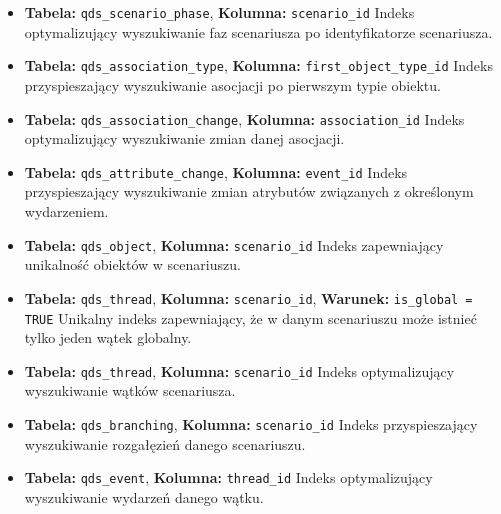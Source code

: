 \begin{itemize}
    \item \textbf{Tabela:} \texttt{qds\_scenario\_phase}, \textbf{Kolumna:} \texttt{scenario\_id}
    Indeks optymalizujący wyszukiwanie faz scenariusza po identyfikatorze scenariusza.

    \item \textbf{Tabela:} \texttt{qds\_association\_type}, \textbf{Kolumna:} \texttt{first\_object\_type\_id}
    Indeks przyspieszający wyszukiwanie asocjacji po pierwszym typie obiektu.

    \item \textbf{Tabela:} \texttt{qds\_association\_change}, \textbf{Kolumna:} \texttt{association\_id}
    Indeks optymalizujący wyszukiwanie zmian danej asocjacji.

    \item \textbf{Tabela:} \texttt{qds\_attribute\_change}, \textbf{Kolumna:} \texttt{event\_id}
    Indeks przyspieszający wyszukiwanie zmian atrybutów związanych z określonym wydarzeniem.

    \item \textbf{Tabela:} \texttt{qds\_object}, \textbf{Kolumna:} \texttt{scenario\_id}
    Indeks zapewniający unikalność obiektów w scenariuszu.

    \item \textbf{Tabela:} \texttt{qds\_thread}, \textbf{Kolumna:} \texttt{scenario\_id}, \textbf{Warunek:} \texttt{is\_global = TRUE}
    Unikalny indeks zapewniający, że w danym scenariuszu może istnieć tylko jeden wątek globalny.

    \item \textbf{Tabela:} \texttt{qds\_thread}, \textbf{Kolumna:} \texttt{scenario\_id}
    Indeks optymalizujący wyszukiwanie wątków scenariusza.

    \item \textbf{Tabela:} \texttt{qds\_branching}, \textbf{Kolumna:} \texttt{scenario\_id}
    Indeks przyspieszający wyszukiwanie rozgałęzień danego scenariuszu.

    \item \textbf{Tabela:} \texttt{qds\_event}, \textbf{Kolumna:} \texttt{thread\_id}
    Indeks optymalizujący wyszukiwanie wydarzeń danego wątku.
\end{itemize}
